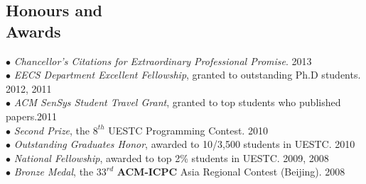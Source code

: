 \documentclass[margin, centered]{resume}
\begin{document}
\begin{resume}



    \section{\mysidestyle Honours and\\Awards} 

    $\bullet$ \textsl{Chancellor's Citations for Extraordinary Professional Promise}. \hfill 2013 \\
    $\bullet$ \textsl{EECS Department Excellent Fellowship}, granted to outstanding Ph.D students. \hfill 2012, 2011\vspace{0mm}\\%
    $\bullet$ \textsl{ACM SenSys Student Travel Grant}, granted to top students who published papers.\hfill 2011\vspace{0mm}\\%
    $\bullet$ \textsl{Second Prize}, the $8^{th}$ UESTC Programming Contest. \hfill 2010\vspace{0mm}\\%
    $\bullet$ \textsl{Outstanding Graduates Honor}, awarded to 10/3,500 students in UESTC. \hfill 2010\vspace{0mm}\\%
    $\bullet$ \textsl{National Fellowship}, awarded to top 2\% students in UESTC. \hfill 2009, 2008\vspace{0mm}\\%
    $\bullet$ \textsl{Bronze Medal}, the $33^{rd}$ \textbf{ACM-ICPC} Asia Regional Contest (Beijing). \hfill 2008\vspace{-5mm}\\ 


\end{resume}
\end{document}
